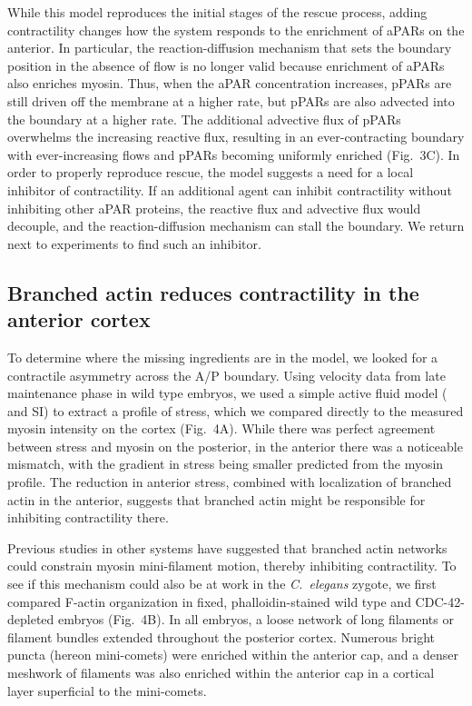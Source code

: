 \documentclass[11pt]{article}
\newcommand{\6}[1]{#1_{\text{6}}}
\newcommand{\3}[1]{#1_{\text{3}}}
\begin{document}
While this model reproduces the initial stages of the rescue process, adding contractility changes how the system responds to the enrichment of aPARs on the anterior. In particular, the reaction-diffusion mechanism that sets the boundary position in the absence of flow is no longer valid because enrichment of aPARs also enriches myosin. Thus, when the aPAR concentration increases, pPARs are still driven off the membrane at a higher rate, but pPARs are also advected into the boundary at a higher rate. The additional advective flux of pPARs overwhelms the increasing reactive flux, resulting in an ever-contracting boundary with ever-increasing flows and pPARs becoming uniformly enriched (Fig.\ 3C). In order to properly reproduce rescue, the model suggests a need for a local inhibitor of contractility. If an additional agent can inhibit contractility without inhibiting other aPAR proteins, the reactive flux and advective flux would decouple, and the reaction-diffusion mechanism can stall the boundary. We return next to experiments to find such an inhibitor.

\subsection*{Branched actin reduces contractility in the anterior cortex }
To determine where the missing ingredients are in the model, we looked for a contractile asymmetry across the A/P boundary. Using velocity data from late maintenance phase in wild type embryos, we used a simple active fluid model (\cite{mayer2010anisotropies} and SI) to extract a profile of stress, which we compared directly to the measured myosin intensity on the cortex (Fig.\ 4A). While there was perfect agreement between stress and myosin on the posterior, in the anterior there was a noticeable mismatch, with the gradient in stress being smaller predicted from the myosin profile. The reduction in anterior stress, combined with localization of branched actin in the anterior, suggests that branched actin might be responsible for inhibiting contractility there. 

Previous studies in other systems \citep{yang2012arp2, muresan2022f} have suggested that branched actin networks could constrain myosin mini-filament motion, thereby inhibiting contractility. To see if this mechanism could also be at work in the \emph{C.\ elegans} zygote, we first compared F-actin organization in fixed, phalloidin-stained wild type and CDC-42-depleted embryos (Fig.\ 4B). In all embryos, a loose network of long filaments or filament bundles extended throughout the posterior cortex. Numerous bright puncta (hereon mini-comets) were enriched within the anterior cap, and a denser meshwork of filaments was also enriched within the anterior cap in a cortical layer superficial to the mini-comets.
\end{document}
